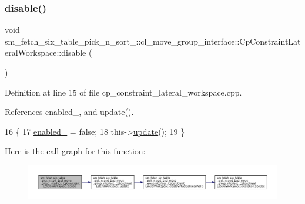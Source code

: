 \subsubsection{\texorpdfstring{disable()}{disable()}}
{\footnotesize\ttfamily void sm\+\_\+fetch\+\_\+six\+\_\+table\+\_\+pick\+\_\+n\+\_\+sort\+\_\+::cl\+\_\+move\+\_\+group\+\_\+interface\+::\+Cp\+Constraint\+Lateral\+Workspace\+::disable (\begin{DoxyParamCaption}{ }\end{DoxyParamCaption})}



Definition at line 15 of file cp\+\_\+constraint\+\_\+lateral\+\_\+workspace.\+cpp.



References enabled\+\_\+, and update().


\begin{DoxyCode}
16         \{
17             \hyperlink{classsm__fetch__six__table__pick__n__sort__1_1_1cl__move__group__interface_1_1CpConstraintLateralWorkspace_ab8da476ed73090751dc61b38cb9426a3}{enabled\_} = \textcolor{keyword}{false};
18             this->\hyperlink{classsm__fetch__six__table__pick__n__sort__1_1_1cl__move__group__interface_1_1CpConstraintLateralWorkspace_ac2b93d99ca5fb46aabfa98040124b272}{update}();
19         \}
\end{DoxyCode}
Here is the call graph for this function\+:
\nopagebreak
\begin{figure}[H]
\begin{center}
\leavevmode
\includegraphics[width=350pt]{classsm__fetch__six__table__pick__n__sort__1_1_1cl__move__group__interface_1_1CpConstraintLateralWorkspace_abe866d3ab465ccf96eee650be8f8c557_cgraph}
\end{center}
\end{figure}
\mbox{\label{classsm__fetch__six__table__pick__n__sort__1_1_1cl__move__group__interface_1_1CpConstraintLateralWorkspace_a91801fc90494a12a4040b56f2f25e047}} 
